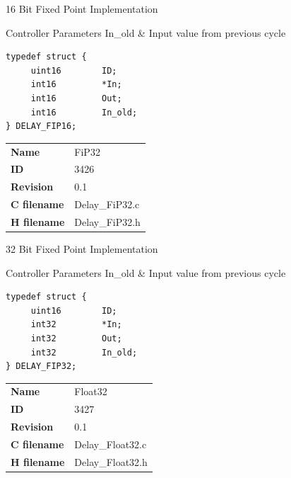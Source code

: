 16 Bit Fixed Point Implementation

\begin{XtoCtabular}{Controller Parameters}
In\_old & Input value from previous cycle\tabularnewline
\hline
\end{XtoCtabular}

\begin{lstlisting}
typedef struct {
     uint16        ID;
     int16         *In;
     int16         Out;
     int16         In_old;
} DELAY_FIP16;
\end{lstlisting}

\ifdefined \AddTestReports
{}
\fi
{}
\nopagebreak[0]
\begin{tabular}{l l}
\textbf{Name} & FiP32 \tabularnewline
\textbf{ID} & 3426 \tabularnewline
\textbf{Revision} & 0.1 \tabularnewline
\textbf{C filename} & Delay\_FiP32.c \tabularnewline
\textbf{H filename} & Delay\_FiP32.h \tabularnewline
\end{tabular}
\vspace{1ex}

32 Bit Fixed Point Implementation

\begin{XtoCtabular}{Controller Parameters}
In\_old & Input value from previous cycle\tabularnewline
\hline
\end{XtoCtabular}

\begin{lstlisting}
typedef struct {
     uint16        ID;
     int32         *In;
     int32         Out;
     int32         In_old;
} DELAY_FIP32;
\end{lstlisting}

\ifdefined \AddTestReports
{}
\fi
{}
\nopagebreak[0]
\begin{tabular}{l l}
\textbf{Name} & Float32 \tabularnewline
\textbf{ID} & 3427 \tabularnewline
\textbf{Revision} & 0.1 \tabularnewline
\textbf{C filename} & Delay\_Float32.c \tabularnewline
\textbf{H filename} & Delay\_Float32.h \tabularnewline
\end{tabular}
\vspace{1ex}

